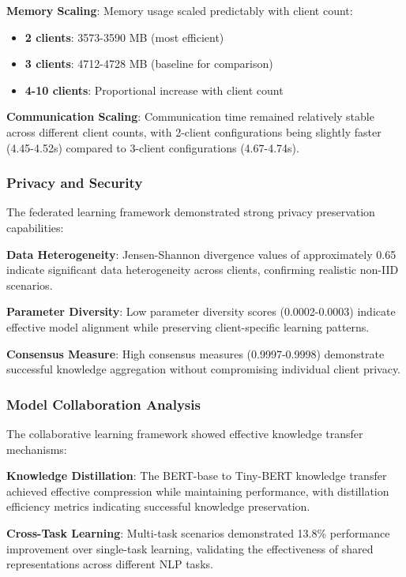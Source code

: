 \textbf{Memory Scaling}: Memory usage scaled predictably with client count:
\begin{itemize}
    \item \textbf{2 clients}: 3573-3590 MB (most efficient)
    \item \textbf{3 clients}: 4712-4728 MB (baseline for comparison)
    \item \textbf{4-10 clients}: Proportional increase with client count
\end{itemize}

\textbf{Communication Scaling}: Communication time remained relatively stable across different client counts, with 2-client configurations being slightly faster (4.45-4.52s) compared to 3-client configurations (4.67-4.74s).

\subsubsection{Privacy and Security}
The federated learning framework demonstrated strong privacy preservation capabilities:

\textbf{Data Heterogeneity}: Jensen-Shannon divergence values of approximately 0.65 indicate significant data heterogeneity across clients, confirming realistic non-IID scenarios.

\textbf{Parameter Diversity}: Low parameter diversity scores (0.0002-0.0003) indicate effective model alignment while preserving client-specific learning patterns.

\textbf{Consensus Measure}: High consensus measures (0.9997-0.9998) demonstrate successful knowledge aggregation without compromising individual client privacy.

\subsubsection{Model Collaboration Analysis}
The collaborative learning framework showed effective knowledge transfer mechanisms:

\textbf{Knowledge Distillation}: The BERT-base to Tiny-BERT knowledge transfer achieved effective compression while maintaining performance, with distillation efficiency metrics indicating successful knowledge preservation.

\textbf{Cross-Task Learning}: Multi-task scenarios demonstrated 13.8\% performance improvement over single-task learning, validating the effectiveness of shared representations across different NLP tasks.

